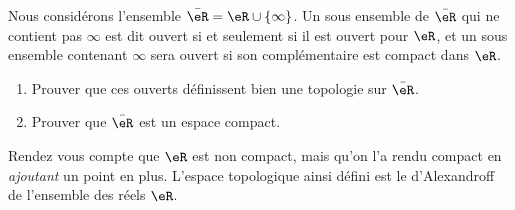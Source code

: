 
\begin{exercice}\label{exo0088}

Nous considérons l'ensemble $\bar\eR=\eR\cup\{\infty\}$. Un sous ensemble de $\bar\eR$ qui ne contient pas $\infty$ est dit ouvert si et seulement si il est ouvert pour $\eR$, et un sous ensemble contenant $\infty$ sera ouvert si son complémentaire est compact dans $\eR$.

\begin{enumerate}

\item
Prouver que ces ouverts définissent bien une topologie sur $\bar\eR$.

\item
Prouver que $\bar\eR$ est un espace compact.

\end{enumerate}
Rendez vous compte que $\eR$ est non compact, mais qu'on l'a rendu compact en \emph{ajoutant} un point en plus. L'espace topologique ainsi défini est le  d'Alexandroff de l'ensemble des réels $\eR$.

\end{exercice}
